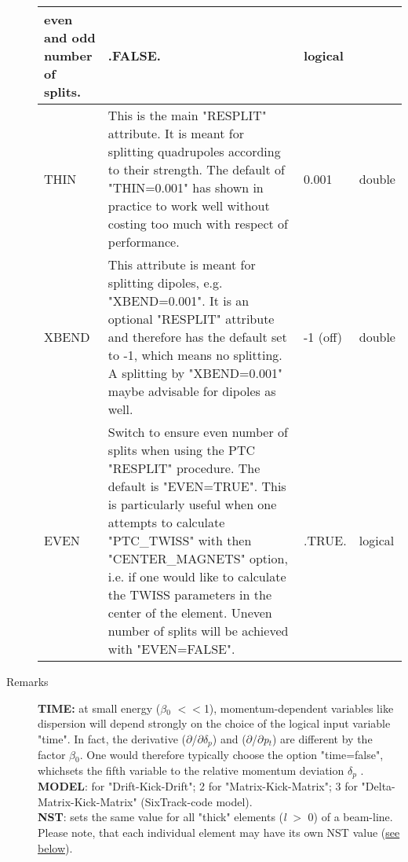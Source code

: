 \begin{description}
\begin{longtable}{l p{8cm} p{2cm} p{2cm}}
    even and odd number        of splits. &      
    .FALSE. & logical \\
    \hline
    THIN & 
    This is the main "RESPLIT" attribute. It is meant        for
    splitting quadrupoles according to their strength. The default
    of "THIN=0.001" has shown in practice to        work well without
    costing too much with respect of performance.  &  
    0.001 & double \\
    \hline
    XBEND & 
    This attribute is meant for splitting dipoles,
    e.g. "XBEND=0.001". It is an optional "RESPLIT" attribute and
    therefore has the        default set to -1, which means no
    splitting. A splitting by "XBEND=0.001" maybe advisable for dipoles
    as well.  &  
    -1 (off) & double \\
    \hline
    EVEN & 
    Switch to ensure even number of splits when using the PTC "RESPLIT"
    procedure. The default is "EVEN=TRUE". This is particularly useful
    when one attempts to calculate "PTC\_TWISS" with then
    "CENTER\_MAGNETS" option, i.e. if one        would like to calculate
    the TWISS parameters in the center of        the element. Uneven
    number of splits will be achieved with "EVEN=FALSE". &  
    .TRUE. & logical \\
    \hline
  \end{longtable}
  
\item[Remarks] 
  \text{ \\}
  
  \textbf{TIME:} at small energy ($\beta$$_0$  $<$$<$1),
  momentum-dependent variables like dispersion will depend  strongly on
  the choice of  the logical input variable "time".  In fact, the
  derivative ($\partial$/$\partial$\textit{$\delta$}$_\textit{p}$)  and
  ($\partial$/$\partial$\textit{p}$_\textit{t}$)  are different by the
  factor \textit{$\beta$}$_0$. One would  therefore typically  choose
  the option "time=false",  which\nolinebreak sets the fifth variable to
  the relative momentum deviation \textit{$ \delta_p$ }.\\   
  \textbf{MODEL}:\nolinebreak{} for "Drift-Kick-Drift"; 2
  for "Matrix-Kick-Matrix"; 3 for  "Delta-Matrix-Kick-Matrix"
  (SixTrack-code model).\\  
  \textbf{NST}: sets the same value  for all "thick" elements (\textit{l
  }$>$ 0) of a beam-line.  Please note, that each individual element may
  have its own NST  value (\hyperlink{individual}{see below}).\\ 

\end{description}

